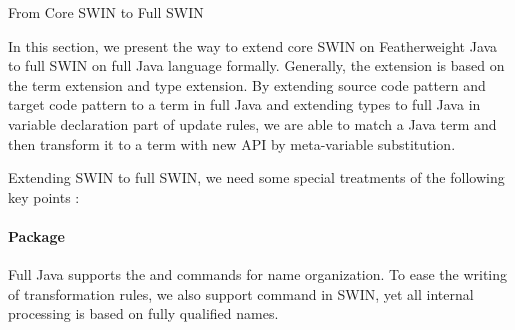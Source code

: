 \begin{section}{From Core SWIN to Full SWIN%
  }
\label{sec:extension}

In this section, we present the way to extend core SWIN on
Featherweight Java to full SWIN on full Java language formally.
Generally, the extension is based on the term extension and type
extension. By extending source code pattern and target code pattern to
a term in full Java and extending types to full Java in variable
declaration part of update rules, we are able to match a Java term and
then transform it to a term with new API by meta-variable
substitution.
\par
Extending SWIN to full SWIN, we need some special treatments of the following key points :

\paragraph{Package} %
Full Java supports the  and  commands for name organization. To ease the writing
of transformation rules, we also support  command in
SWIN, yet all internal processing is based on fully qualified names.


\end{section}
